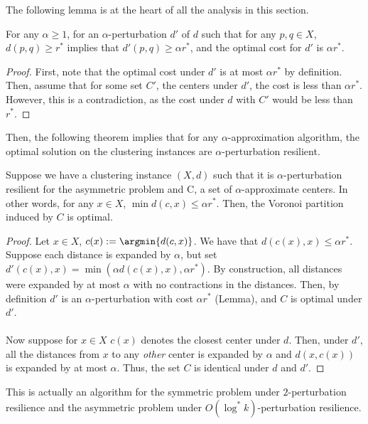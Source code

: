 The following lemma is at the heart of all the analysis in this section.

\begin{lemma}
For any $\alpha\geq1$, for an $\alpha$-perturbation $d'$ of $d$ such that for any $p,q\in X$, $d(p,q)\geq r^*$ implies that $d'(p,q)\geq\alpha r^*$, and the optimal cost for $d'$ is $\alpha r^*$.
\end{lemma}

\begin{proof}
First, note that the optimal cost under $d'$ is at most $\alpha r^*$ by definition. Then, assume that for some set $C'$, the centers under $d'$, the cost is less than $\alpha r^*$. However, this is a contradiction, as the cost under $d$ with $C'$ would be less than $r^*$.
\end{proof}

Then, the following theorem implies that for any $\alpha$-approximation algorithm, the optimal solution on the clustering instances are $\alpha$-perturbation resilient.

\begin{theorem}
Suppose we have a clustering instance $(X,d)$ such that it is $\alpha$-perturbation resilient for the asymmetric problem and C, a set of $\alpha$-approximate centers. In other words, for any $x\in X$, $\min d(c,x)\leq\alpha r^*$. Then, the Voronoi partition induced by $C$ is optimal.
\end{theorem}

\begin{proof}
Let $x\in X$, $c(x):=\argmin{d(c,x)}$. We have that $d(c(x),x)\leq\alpha r^*$. Suppose each distance is expanded by $\alpha$, but set $d'(c(x),x)=\min(\alpha d(c(x),x),\alpha r^*)$. By construction, all distances were expanded by at most $\alpha$ with no contractions in the distances. Then, by definition $d'$ is an $\alpha$-perturbation with cost $\alpha r^*$ (Lemma), and $C$ is optimal under $d'$.\\\\

Now suppose for $x\in X$ $c(x)$ denotes the closest center under $d$. Then, under $d'$, all the distances from $x$ to any \emph{other} center is expanded by $\alpha$ and $d(x,c(x))$ is expanded by at most $\alpha$. Thus, the set $C$ is identical under $d$ and $d'$.
\end{proof}

\begin{remark}
This is actually an algorithm for the symmetric problem under $2$-perturbation resilience and the asymmetric problem under $O(\log^*k)$-perturbation resilience.
\end{remark}

